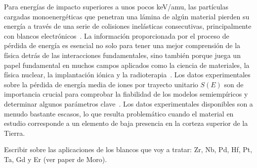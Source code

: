 Para energías de impacto superiores a unos pocos keV/amu, las 
partículas cargadas monoenergéticas que penetran una lámina de 
algún material pierden su energía a través de una serie de colisiones 
inelásticas consecutivas, principalmente con blancos 
electrónicos~\cite{Chu01,Sigmund}. La información proporcionada por el 
proceso de pérdida de energía es esencial no solo para tener una mejor 
comprensión de la física detrás de las interacciones fundamentales, 
sino también porque juega un papel fundamental en muchos campos 
aplicados como la ciencia de materiales, la física nuclear, la 
implantación iónica y la radioterapia~\cite{Sigmund,Schardt}. Los datos 
experimentales sobre la pérdida de energía media de iones por trayecto 
unitario $S(E)$ son de importancia crucial para comprobar la fiabilidad 
de los modelos semiempíricos y determinar algunos parámetros 
clave~\cite{Diwan,Damache04,Damache02}. Los datos experimentales 
disponibles son a menudo bastante escasos, lo que resulta problemático 
cuando el material en estudio corresponde a un elemento de baja 
presencia en la corteza superior de la Tierra. %

{\color{red} Escribir sobre las aplicaciones de los blancos que voy a 
tratar: Zr, Nb, Pd, Hf, Pt, Ta, Gd y Er  (ver paper de Moro).}



